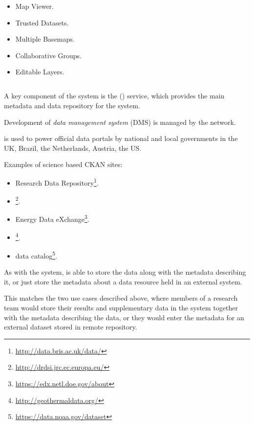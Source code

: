 \documentclass{article}
\begin{document}
\begin{itemize}
    \item Map Viewer.
    \item Trusted Datasets.
    \item Multiple Basemaps.
    \item Collaborative Groups.
    \item Editable Layers.
\end{itemize}

\subsection{}

A key component of the  system is the 
(\cite{ckan}) service, which provides the main metadata and data repository
for the system.

Development of \cite{ckan} \textit{data management system} (DMS) is managed
by the  network.

\cite{ckan} is used to power official data portals by national and local
governments in the UK, Brazil, the Netherlands, Austria, the US.

Examples of science based CKAN sites:
\begin{itemize}
    \item {} Research Data Repository\footnote{\url{http://data.bris.ac.uk/data/}}.
    \item {}\footnote{\url{http://drdsi.jrc.ec.europa.eu/}}.
    \item {} Energy Data eXchange\footnote{\url{https://edx.netl.doe.gov/about}}.
    \item {} \footnote{\url{http://geothermaldata.org/}}.
    \item {} data catalog\footnote{\url{https://data.noaa.gov/dataset}}.
\end{itemize}

As with the \cite{metacat} system, \cite{ckan} is able to store the data
along with the metadata describing it, or just store the metadata about
a data resource held in an external system.

This matches the two use cases described above, where members of a research
team would store their results and supplementary data in the \cite{trop}
system together with the metadata describing the data, or they would enter
the metadata for an external dataset stored in remote repository.
\end{document}
